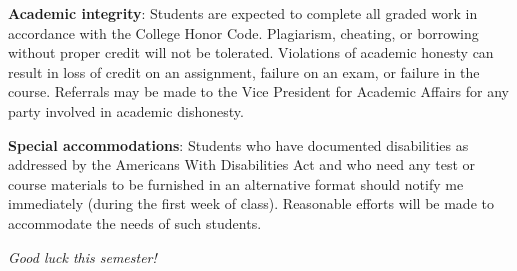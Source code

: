 \documentclass[12pt,twoside]{amsart}
\begin{document}
\textbf{Academic integrity}: Students are expected to complete all graded work in accordance with the College Honor Code. Plagiarism, cheating, or borrowing without proper credit will not be tolerated.  Violations of academic honesty can result in loss of credit on an assignment, failure on an exam, or failure in the course. Referrals may be made to the Vice President for Academic Affairs for any party involved in academic dishonesty.

\textbf{Special accommodations}: Students who have documented disabilities as addressed by the Americans With Disabilities Act and who need any test or course materials to be furnished in an alternative format should notify me immediately (during the first week of class).  Reasonable efforts will be made to accommodate the needs of such students.


\begin{center}
\emph{ {\LARGE Good luck this semester!} }
\end{center}

\end{document}
